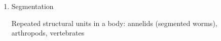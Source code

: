 \begin{frame}[t]
    \begin{adjustwidth}{-2em}{-1.5em}

        \begin{enumerate}
            \addtocounter{enumi}{4}

            \item Segmentation 

                \vspace{2mm}
                Repeated structural units in a body: annelids (segmented worms),
                arthropods, vertebrates
        \end{enumerate}



\end{adjustwidth}
\end{frame}
